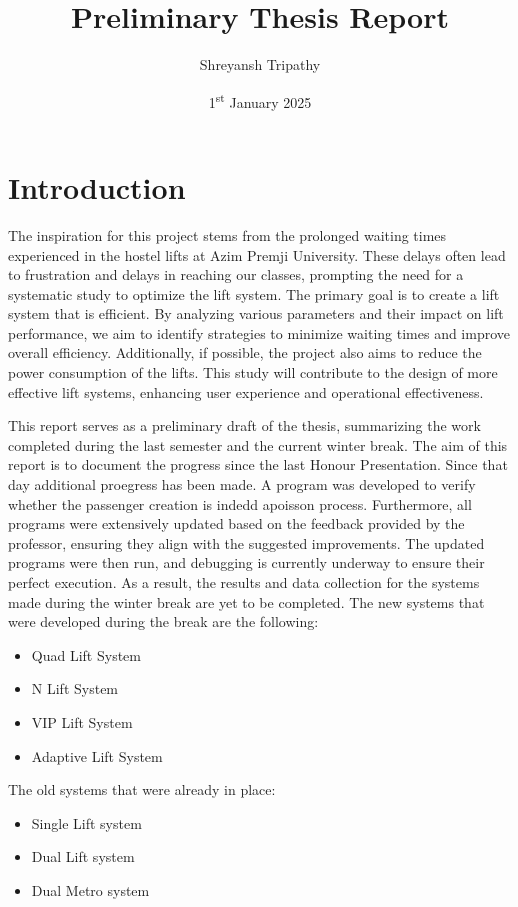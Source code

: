 \documentclass[12pt,a4paper]{report}
\title{Preliminary Thesis Report}
\author{Shreyansh Tripathy}
\date{1\textsuperscript{st} January 2025}
\begin{document}
\maketitle

\tableofcontents

\chapter{Introduction}
The inspiration for this project stems from the prolonged waiting times experienced in the hostel lifts at Azim Premji University. These delays often lead to frustration and delays in reaching our classes, prompting the need for a systematic study to optimize the lift system. The primary goal is to create a lift system that is efficient. By analyzing various parameters and their impact on lift performance, we aim to identify strategies to minimize waiting times and improve overall efficiency. Additionally, if possible, the project also aims to reduce the power consumption of the lifts. This study will contribute to the design of more effective lift systems, enhancing user experience and operational effectiveness.

This report serves as a preliminary draft of the thesis, summarizing the work completed during the last semester and the current winter break. The aim of this report is to document the progress since the last Honour Presentation. Since that day additional proegress has been made. A program was developed to verify whether the passenger creation is indedd apoisson process. Furthermore, all programs were extensively updated based on the feedback provided by the professor, ensuring they align with the suggested improvements. The updated programs were then run, and debugging is currently underway to ensure their perfect execution. As a result, the results and data collection for the systems made during the winter break are yet to be completed.
The new systems that were developed during the break are the following:
\begin{itemize}
    \item Quad Lift System
    \item N Lift System
    \item VIP Lift System
    \item Adaptive Lift System
\end{itemize}
The old systems that were already in place:
\begin{itemize}
    \item Single Lift system
    \item Dual Lift system
    \item Dual Metro system
\end{itemize}
\end{document}
